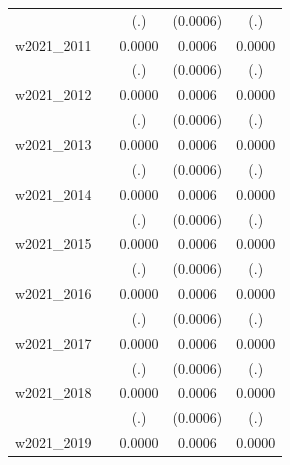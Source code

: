 \begin{table}[htbp]
\begin{tabular}{l*{4}{c}}
            &                     &         (.)         &    (0.0006)         &         (.)         \\
[1em]
w2021\_2011  &                     &      0.0000         &      0.0006         &      0.0000         \\
            &                     &         (.)         &    (0.0006)         &         (.)         \\
[1em]
w2021\_2012  &                     &      0.0000         &      0.0006         &      0.0000         \\
            &                     &         (.)         &    (0.0006)         &         (.)         \\
[1em]
w2021\_2013  &                     &      0.0000         &      0.0006         &      0.0000         \\
            &                     &         (.)         &    (0.0006)         &         (.)         \\
[1em]
w2021\_2014  &                     &      0.0000         &      0.0006         &      0.0000         \\
            &                     &         (.)         &    (0.0006)         &         (.)         \\
[1em]
w2021\_2015  &                     &      0.0000         &      0.0006         &      0.0000         \\
            &                     &         (.)         &    (0.0006)         &         (.)         \\
[1em]
w2021\_2016  &                     &      0.0000         &      0.0006         &      0.0000         \\
            &                     &         (.)         &    (0.0006)         &         (.)         \\
[1em]
w2021\_2017  &                     &      0.0000         &      0.0006         &      0.0000         \\
            &                     &         (.)         &    (0.0006)         &         (.)         \\
[1em]
w2021\_2018  &                     &      0.0000         &      0.0006         &      0.0000         \\
            &                     &         (.)         &    (0.0006)         &         (.)         \\
[1em]
w2021\_2019  &                     &      0.0000         &      0.0006         &      0.0000         \\

\end{tabular}
\end{table}
